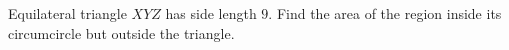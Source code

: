 Equilateral triangle $XYZ$ has side length $9$. Find the area of the region inside its circumcircle but outside the triangle.
